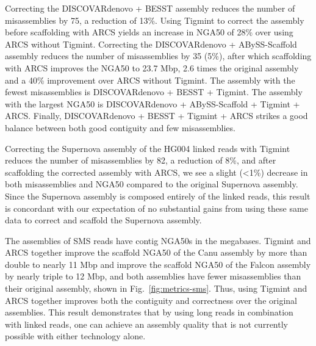 \documentclass{bmcart}
\begin{document}
Correcting the DISCOVARdenovo + BESST assembly reduces the number of misassemblies by 75, a reduction of 13\%. Using Tigmint to correct the assembly before scaffolding with ARCS yields an increase in NGA50 of 28\% over using ARCS without Tigmint. Correcting the DISCOVARdenovo + ABySS-Scaffold assembly reduces the number of misassemblies by 35 (5\%), after which scaffolding with ARCS improves the NGA50 to 23.7 Mbp, 2.6 times the original assembly and a 40\% improvement over ARCS without Tigmint. The assembly with the fewest misassemblies is DISCOVARdenovo + BESST + Tigmint. The assembly with the largest NGA50 is DISCOVARdenovo + ABySS-Scaffold + Tigmint + ARCS. Finally, DISCOVARdenovo + BESST + Tigmint + ARCS strikes a good balance between both good contiguity and few misassemblies.

Correcting the Supernova assembly of the HG004 linked reads with Tigmint reduces the number of misassemblies by 82, a reduction of 8\%, and after scaffolding the corrected assembly with ARCS, we see a slight (\textless{}1\%) decrease in both misassemblies and NGA50 compared to the original Supernova assembly. Since the Supernova assembly is composed entirely of the linked reads, this result is concordant with our expectation of no substantial gains from using these same data to correct and scaffold the Supernova assembly.

The assemblies of SMS reads have contig NGA50s in the megabases. Tigmint and ARCS together improve the scaffold NGA50 of the Canu assembly by more than double to nearly 11 Mbp and improve the scaffold NGA50 of the Falcon assembly by nearly triple to 12 Mbp, and both assemblies have fewer misassemblies than their original assembly, shown in Fig.~\ref{fig:metrics-sms}. Thus, using Tigmint and ARCS together improves both the contiguity and correctness over the original assemblies. This result demonstrates that by using long reads in combination with linked reads, one can achieve an assembly quality that is not currently possible with either technology alone.
\end{document}
